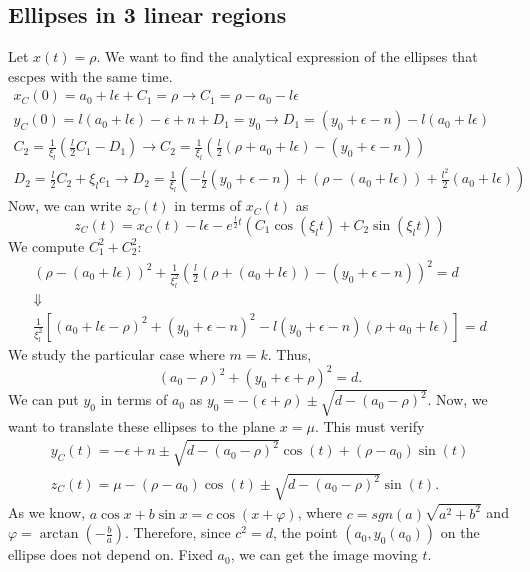 \documentclass[a4paper,preprint,11pt]{article}
\begin{document}
\subsection{Ellipses in 3 linear regions}
Let $x(t)=\rho$. We want to find the analytical expression of the ellipses that escpes with the same time.
$$
\begin{array}{l}
x_C(0) = a_0+l\epsilon + C_1 = \rho \longrightarrow \boxed{C_1 = \rho-a_0-l\epsilon} \\
y_C(0) = l(a_0+l\epsilon)-\epsilon+n+D_1 = y_0 \longrightarrow \boxed{D_1 = (y_0+\epsilon-n)-l(a_0+l\epsilon)} \\
C_2 = \frac{1}{\xi_l}(\frac{l}{2}C_1-D_1) \longrightarrow \boxed{C_2 = \frac{1}{\xi_l}(\frac{l}{2}(\rho+a_0+l\epsilon)-(y_0+\epsilon-n))} \\
D_2 = \frac{l}{2}C_2 + \xi_lc_1 \longrightarrow \boxed{D_2 = \frac{1}{\xi_l}(-\frac{l}{2}(y_0+\epsilon-n)+(\rho-(a_0+l\epsilon))+\frac{l^2}{2}(a_0+l\epsilon))}
\end{array}
$$
Now, we can write $z_C(t)$ in terms of $x_C(t)$ as
$$
z_C(t) = x_C(t)-l\epsilon - e^{\frac{l}{2}t}(C_1\cos(\xi_lt)+C_2\sin(\xi_lt))
$$
We compute $C_1^2+C_2^2$:
$$
\begin{array}{c}
(\rho-(a_0+l\epsilon))^2 + \frac{1}{\xi_l^2}(\frac{l}{2}(\rho +(a_0+l\epsilon))-(y_0+\epsilon-n))^2 = d \\
\Downarrow \\
\frac{1}{\xi_l^2}[(a_0+l\epsilon-\rho)^2 + (y_0+\epsilon-n)^2-l(y_0+\epsilon-n)(\rho+a_0+l\epsilon)] = d
\end{array}
$$
We study the particular case where $m=k$. Thus,
$$
(a_0-\rho)^2 +(y_0+\epsilon+\rho)^2 = d.
$$
We can put $y_0$ in terms of $a_0$ as $y_0 = -(\epsilon+\rho)\pm\sqrt{d-(a_0-\rho)^2}$. Now, we want to translate these ellipses to the plane $x=\mu$. This must verify
$$
\begin{array}{l}
y_C(t) = -\epsilon +n \pm \sqrt{d-(a_0-\rho)^2}\cos(t) + (\rho-a_0)\sin(t) \\
z_C(t) = \mu -(\rho-a_0)\cos(t)\pm\sqrt{d-(a_0-\rho)^2}\sin(t).
\end{array}
$$
As we know, $a\cos x+b\sin x=c\cos(x+\varphi)$, where $c=sgn(a)\sqrt{a^2+b^2}$ and $\varphi=\arctan(-\frac{b}{a})$. Therefore, since $c^2=d$, the point $(a_0,y_0(a_0))$ on the ellipse does not depend on. Fixed $a_0$, we can get the image moving $t$.
\end{document}
